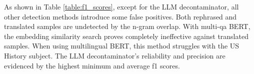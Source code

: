 

As shown in Table \ref{table:f1_scores}, except for the LLM decontaminator, all other detection methods introduce some false positives. Both rephrased and translated samples are undetected by the n-gram overlap. With multi-qa BERT, the embedding similarity search proves completely ineffective against translated samples. When using multilingual BERT, this method struggles with the US History subject. 
The LLM decontaminator's reliability and precision are evidenced by the highest minimum and average f1 scores.

